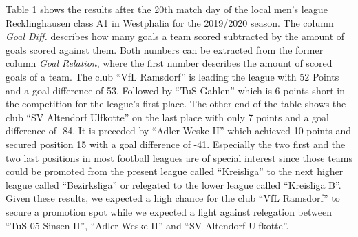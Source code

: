 \documentclass[12pt,a4paper]{article}
\begin{document}
Table 1 shows the results after the 20th match day of the local men's
league Recklinghausen class A1 in Westphalia for the 2019/2020 season.
The column \emph{Goal Diff.} describes how many goals a team scored
subtracted by the amount of goals scored against them. Both numbers can
be extracted from the former column \emph{Goal Relation}, where the
first number describes the amount of scored goals of a team. The club
\enquote{VfL Ramsdorf} is leading the league with 52 Points and a goal
difference of 53. Followed by \enquote{TuS Gahlen} which is 6 points
short in the competition for the league's first place. The other end of
the table shows the club \enquote{SV Altendorf Ulfkotte} on the last
place with only 7 points and a goal difference of -84. It is preceded by
\enquote{Adler Weske II} which achieved 10 points and secured position
15 with a goal difference of -41. Especially the two first and the two
last positions in most football leagues are of special interest since
those teams could be promoted from the present league called
\enquote{Kreisliga} to the next higher league called
\enquote{Bezirksliga} or relegated to the lower league called
\enquote{Kreisliga B}. Given these results, we expected a high chance
for the club \enquote{VfL Ramsdorf} to secure a promotion spot while we
expected a fight against relegation between \enquote{TuS 05 Sinsen II},
\enquote{Adler Weske II} and \enquote{SV Altendorf-Ulfkotte}.
\end{document}
